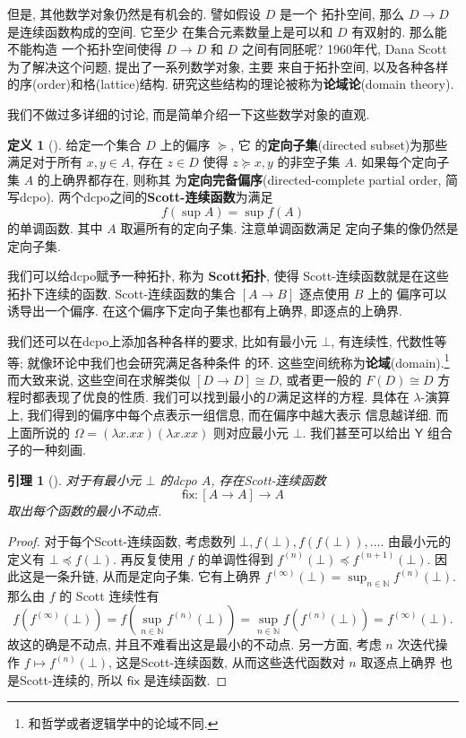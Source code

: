 \documentclass[UTF8]{ctexbook}
\newcommand{\cons}[1]{\textsf{#1}}
\theoremstyle{plain}
\newtheorem{lemma}{引理}[chapter]
\theoremstyle{definition}
\newtheorem{definition}{定义}[chapter]
\theoremstyle{remark}
\begin{document}
但是, 其他数学对象仍然是有机会的. 譬如假设 \(D\) 是一个
拓扑空间, 那么 \(D \to D\) 是连续函数构成的空间. 它至少
在集合元素数量上是可以和 \(D\) 有双射的. 那么能不能构造
一个拓扑空间使得 \(D \to D\) 和 \(D\) 之间有同胚呢?
1960年代, Dana Scott 为了解决这个问题, 提出了一系列数学对象, 主要
来自于拓扑空间, 以及各种各样的序(order)和格(lattice)结构.
研究这些结构的理论被称为\textbf{论域论}(domain theory).

我们不做过多详细的讨论, 而是简单介绍一下这些数学对象的直观.
\begin{definition}[{\cite[\S\S2.1.5--2.1.6]{abramsky:1995:domain}}]
给定一个集合 \(D\) 上的偏序 \(\succeq\), 它
的\textbf{定向子集}(directed subset)为那些满足对于所有 \(x,y\in A\),
存在 \(z \in D\) 使得 \(z \succeq x, y\) 的非空子集
\(A\). 如果每个定向子集 \(A\) 的上确界都存在, 则称其
为\textbf{定向完备偏序}(directed-complete partial order, 简写dcpo).
两个dcpo之间的\textbf{Scott-连续函数}为满足
\[f\left(\sup A\right) = \sup f(A)\]
的单调函数. 其中 \(A\) 取遍所有的定向子集. 注意单调函数满足
定向子集的像仍然是定向子集.
\end{definition}
我们可以给dcpo赋予一种拓扑, 称为 \textbf{Scott拓扑},
使得 Scott-连续函数就是在这些拓扑下连续的函数.
Scott-连续函数的集合 \([A \to B]\) 逐点使用 \(B\) 上的
偏序可以诱导出一个偏序. 在这个偏序下定向子集也都有上确界,
即逐点的上确界.

我们还可以在dcpo上添加各种各样的要求, 比如有最小元 \(\bot\),
有连续性, 代数性等等; 就像环论中我们也会研究满足各种条件
的环. 这些空间统称为\textbf{论域}(domain).\footnote{和哲学或者逻辑学中的论域不同.}
而大致来说, 这些空间在求解类似 \([D \to D] \cong D\),
或者更一般的 \(F(D) \cong D\) 方程时都表现了优良的性质.
我们可以找到最小的\(D\)满足这样的方程. 具体在 \(\lambda\)-演算
上, 我们得到的偏序中每个点表示一组信息, 而在偏序中越大表示
信息越详细. 而上面所说的 \(\Omega = (\lambda x. xx) (\lambda x.xx)\)
则对应最小元 \(\bot\). 我们甚至可以给出 \(\cons{Y}\)
组合子的一种刻画.
\begin{lemma}[{\cite[定理2.1.19]{abramsky:1995:domain}}]
对于有最小元 \(\bot\) 的dcpo \(A\),
存在Scott-连续函数 \[\cons{fix} : [A \to A] \to A\]
取出每个函数的最小不动点.
\end{lemma}
\begin{proof}
对于每个Scott-连续函数,
考虑数列 \(\bot, f(\bot), f(f(\bot)),\dots\).
由最小元的定义有 \(\bot \preceq f(\bot)\). 再反复使用
\(f\) 的单调性得到 \(f^{(n)}(\bot) \preceq f^{(n+1)}(\bot)\).
因此这是一条升链, 从而是定向子集. 它有上确界
\(f^{(\infty)}(\bot) = \sup_{n\in\mathbb N}f^{(n)}(\bot).\)
那么由 \(f\) 的 Scott 连续性有
\[f(f^{(\infty)}(\bot)) = f(\sup_{n\in\mathbb N}f^{(n)}(\bot))
= \sup_{n\in\mathbb N} f(f^{(n)}(\bot)) = f^{(\infty)}(\bot).\]
故这的确是不动点, 并且不难看出这是最小的不动点.
另一方面, 考虑 \(n\) 次迭代操作 \(f \mapsto f^{(n)}(\bot)\),
这是Scott-连续函数, 从而这些迭代函数对 \(n\) 取逐点上确界
也是Scott-连续的, 所以 \(\cons{fix}\) 是连续函数.
\end{proof}
\end{document}
